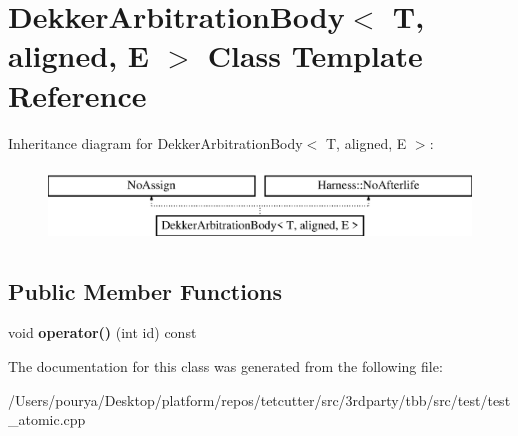 \hypertarget{classDekkerArbitrationBody}{}\section{Dekker\+Arbitration\+Body$<$ T, aligned, E $>$ Class Template Reference}
\label{classDekkerArbitrationBody}
Inheritance diagram for Dekker\+Arbitration\+Body$<$ T, aligned, E $>$\+:\begin{figure}[H]
\begin{center}
\leavevmode
\includegraphics[height=2.000000cm]{classDekkerArbitrationBody}
\end{center}
\end{figure}
\subsection*{Public Member Functions}
\begin{DoxyCompactItemize}
\item 
\hypertarget{classDekkerArbitrationBody_aefd643ab3940d8de61c1575015963f8d}{}void {\bfseries operator()} (int id) const \label{classDekkerArbitrationBody_aefd643ab3940d8de61c1575015963f8d}

\end{DoxyCompactItemize}


The documentation for this class was generated from the following file\+:\begin{DoxyCompactItemize}
\item 
/\+Users/pourya/\+Desktop/platform/repos/tetcutter/src/3rdparty/tbb/src/test/test\+\_\+atomic.\+cpp\end{DoxyCompactItemize}
